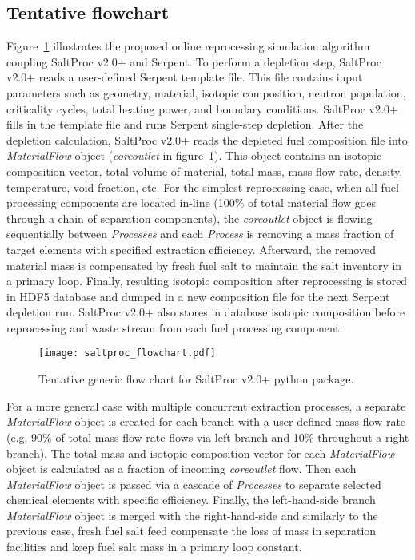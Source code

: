 \subsection{Tentative flowchart}
Figure~\ref{fig:saltproc_flow} illustrates the proposed online reprocessing 
simulation algorithm coupling SaltProc v2.0+ and Serpent. To perform a 
depletion step, SaltProc v2.0+ reads a user-defined Serpent template file. 
This file contains input parameters such as geometry, material, isotopic 
composition, neutron population, criticality cycles, total heating power, and 
boundary conditions. SaltProc v2.0+ fills in the template file and runs 
Serpent single-step depletion. After the depletion calculation, SaltProc v2.0+ 
reads the depleted fuel composition file into \textit{MaterialFlow} object  
(\textit{core\textunderscore outlet} in figure~\ref{fig:saltproc_flow}). This 
object contains an isotopic composition vector, total volume of material, 
total mass, mass flow rate, density, temperature, void fraction, etc. For the 
simplest reprocessing case, when all fuel processing components are located 
in-line (100\% of total material flow goes through a chain of separation 
components), the \textit{core\textunderscore outlet} 
object is flowing sequentially between \textit{Processes} and each 
\textit{Process} is removing a mass fraction of target elements with specified 
extraction efficiency. Afterward, the removed material mass is compensated by 
fresh fuel salt to maintain the salt inventory in a primary loop. 
Finally, resulting isotopic composition after reprocessing is stored in 
HDF5 database and dumped in a new composition file for the next 
Serpent depletion run. SaltProc v2.0+ also stores in database isotopic  
composition before reprocessing and waste stream from each fuel processing 
component. 
\begin{figure}[ht!] %
	\centering
	\texttt{[image: saltproc\_flowchart.pdf]}
	\vspace{-0.15in}
	\caption{Tentative generic flow chart for SaltProc v2.0+ python package.}
	\label{fig:saltproc_flow}
\end{figure}

For a more general case with multiple concurrent extraction processes, a 
separate \textit{MaterialFlow} object is created for each branch with a 
user-defined mass flow rate (e.g. 90\% of total mass flow rate flows via left 
branch and 10\% throughout a right branch). The total mass and isotopic 
composition vector for each \textit{MaterialFlow} object is calculated as a 
fraction of incoming \textit{core\textunderscore outlet} flow. Then each 
\textit{MaterialFlow} object is passed via a cascade of \textit{Processes} to 
separate selected chemical elements with specific efficiency. Finally, the 
left-hand-side branch \textit{MaterialFlow} object is merged with the 
right-hand-side and similarly to the previous case, fresh fuel salt feed 
compensate the loss of mass in separation facilities and keep fuel salt mass 
in a primary loop constant.

